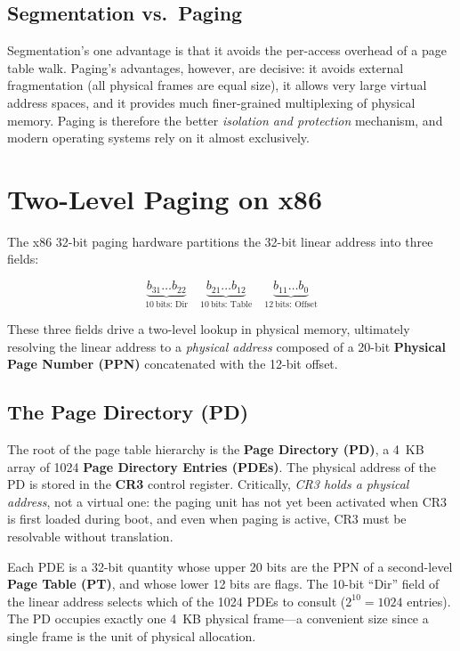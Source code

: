 \documentclass[11pt]{article}
\begin{document}
\subsection{Segmentation vs.\ Paging}

Segmentation's one advantage is that it avoids the per-access overhead of a page table walk. Paging's advantages, however, are decisive: it avoids external fragmentation (all physical frames are equal size), it allows very large virtual address spaces, and it provides much finer-grained multiplexing of physical memory. Paging is therefore the better \emph{isolation and protection} mechanism, and modern operating systems rely on it almost exclusively.

\section{Two-Level Paging on x86}

The x86 32-bit paging hardware partitions the 32-bit linear address into three fields:

\[
\underbrace{b_{31} \ldots b_{22}}_{10\ \text{bits: Dir}} \quad
\underbrace{b_{21} \ldots b_{12}}_{10\ \text{bits: Table}} \quad
\underbrace{b_{11} \ldots b_{0}}_{12\ \text{bits: Offset}}
\]

These three fields drive a two-level lookup in physical memory, ultimately resolving the linear address to a \emph{physical address} composed of a 20-bit \textbf{Physical Page Number (PPN)} concatenated with the 12-bit offset.

\subsection{The Page Directory (PD)}

The root of the page table hierarchy is the \textbf{Page Directory (PD)}, a 4~KB array of 1024 \textbf{Page Directory Entries (PDEs)}. The physical address of the PD is stored in the \textbf{CR3} control register. Critically, \emph{CR3 holds a physical address}, not a virtual one: the paging unit has not yet been activated when CR3 is first loaded during boot, and even when paging is active, CR3 must be resolvable without translation.

Each PDE is a 32-bit quantity whose upper 20 bits are the PPN of a second-level \textbf{Page Table (PT)}, and whose lower 12 bits are flags. The 10-bit ``Dir'' field of the linear address selects which of the 1024 PDEs to consult ($2^{10} = 1024$ entries). The PD occupies exactly one 4~KB physical frame---a convenient size since a single frame is the unit of physical allocation.
\end{document}

